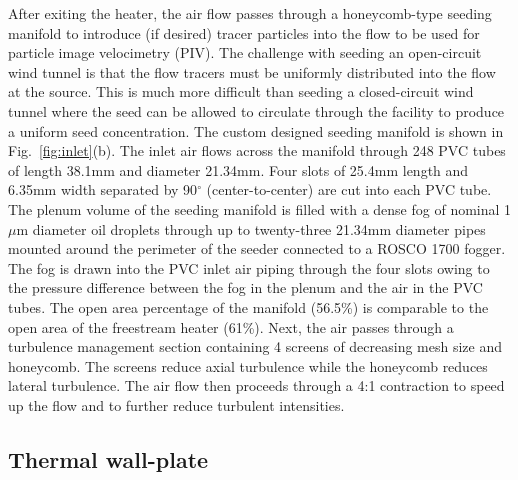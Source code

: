 After exiting the heater, the air flow passes through a honeycomb-type seeding manifold to introduce (if desired) tracer particles into the flow to be used for particle image velocimetry (PIV). The challenge with seeding an open-circuit wind tunnel is that the flow tracers must be uniformly distributed into the flow at the source. This is much more difficult than seeding a closed-circuit wind tunnel where the seed can be allowed to circulate through the facility to produce a uniform seed concentration. The custom designed seeding manifold is shown in Fig.~\ref{fig:inlet}(b). The inlet air flows across the manifold through 248 PVC tubes of length 38.1mm and diameter 21.34mm. Four slots of 25.4mm length and 6.35mm width separated by 90$^\circ$ (center-to-center) are cut into each PVC tube. The plenum volume of the seeding manifold is filled with a dense fog of nominal 1$\mu$m  diameter oil droplets \cite{Shakerin1995} through up to twenty-three 21.34mm diameter pipes mounted around the perimeter of the seeder connected to a ROSCO 1700 fogger. The fog is drawn into the PVC inlet air piping through the four slots owing to the pressure difference between the fog in the plenum and the air in the PVC tubes. The open area percentage of the manifold (56.5\%) is comparable to the open area of the freestream heater (61\%). Next, the air passes through a turbulence management section containing 4 screens of decreasing mesh size and honeycomb. The screens reduce axial turbulence while the honeycomb reduces lateral turbulence. The air flow then proceeds through a 4:1 contraction to speed up the flow and to further reduce turbulent intensities.

\subsection{Thermal wall-plate}

